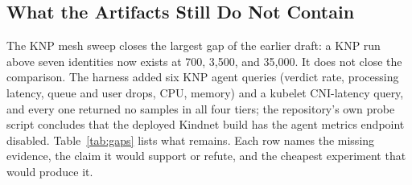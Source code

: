 \documentclass[letterpaper,twocolumn,10pt]{article}
\newcommand{\sys}{\textsc{KNP}}
\begin{document}
\subsection{What the Artifacts Still Do Not Contain}
\label{sec:gaps}
The \sys{} mesh sweep closes the largest gap of the earlier draft: a
\sys{} run above seven identities now exists at 700, 3,500, and 35,000.
It does not close the comparison. The harness added six \sys{} agent
queries (verdict rate, processing latency, queue and user drops, CPU,
memory) and a kubelet CNI-latency query, and every one returned no
samples in all four tiers; the repository's own probe script concludes
that the deployed Kindnet build has the agent metrics endpoint disabled.
Table~\ref{tab:gaps} lists what remains. Each row names the missing
evidence, the claim it would support or refute, and the cheapest
experiment that would produce it.
\end{document}
